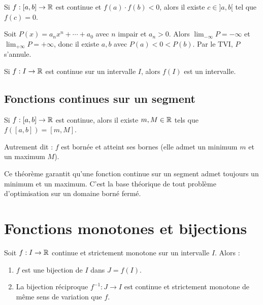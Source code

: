 \begin{corollaire}
Si $f : [a, b] \to \mathbb{R}$ est continue et $f(a) \cdot f(b) < 0$, alors il existe $c \in ]a, b[$ tel que $f(c) = 0$.
\end{corollaire}

\begin{exbox}
Soit $P(x) = a_n x^n + \cdots + a_0$ avec $n$ impair et $a_n > 0$. Alors $\lim_{-\infty} P = -\infty$ et $\lim_{+\infty} P = +\infty$, donc il existe $a, b$ avec $P(a) < 0 < P(b)$. Par le TVI, $P$ s'annule.
\end{exbox}

\begin{corollaire}
Si $f : I \to \mathbb{R}$ est continue sur un intervalle $I$, alors $f(I)$ est un intervalle.
\end{corollaire}

\subsection{Fonctions continues sur un segment}

\begin{thmbox}
Si $f : [a, b] \to \mathbb{R}$ est continue, alors il existe $m, M \in \mathbb{R}$ tels que $f([a, b]) = [m, M]$.

Autrement dit : $f$ est bornée et atteint ses bornes (elle admet un minimum $m$ et un maximum $M$).
\end{thmbox}

\begin{intuitionbox}
Ce théorème garantit qu'une fonction continue sur un segment admet toujours un minimum et un maximum. C'est la base théorique de tout problème d'optimisation sur un domaine borné fermé.
\end{intuitionbox}


\section{Fonctions monotones et bijections}

\begin{thmbox}
Soit $f : I \to \mathbb{R}$ continue et strictement monotone sur un intervalle $I$. Alors :
\begin{enumerate}[leftmargin=1cm]
  \item $f$ est une bijection de $I$ dans $J = f(I)$.
  \item La bijection réciproque $f^{-1} : J \to I$ est continue et strictement monotone de même sens de variation que $f$.
\end{enumerate}
\end{thmbox}

